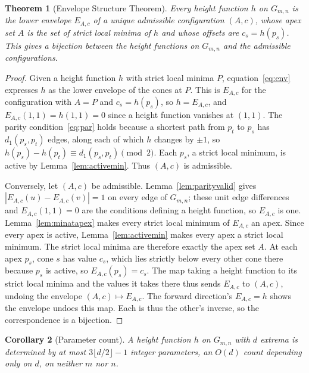 \documentclass[11pt]{article}
\newtheorem{theorem}{Theorem}[section]
\newtheorem{corollary}[theorem]{Corollary}
\theoremstyle{definition}
\theoremstyle{remark}
\newcommand{\dgrid}{d_1}
\newcommand{\Gmn}{G_{m,n}}
\begin{document}
\begin{theorem}[Envelope Structure Theorem]\label{thm:envelope}
Every height function $h$ on $\Gmn$ is the lower envelope $E_{A,c}$ of a
unique admissible configuration $(A,c)$, whose apex set $A$ is the set of
strict local minima of $h$ and whose offsets are $c_s=h(p_s)$. This gives a bijection
between the height functions on $\Gmn$ and the admissible configurations.
\end{theorem}

\begin{proof}
Given a height function $h$ with strict local minima $P$,
equation~\eqref{eq:env} expresses $h$ as the lower envelope of the cones at
$P$. This is $E_{A,c}$ for the configuration with $A=P$ and
$c_s=h(p_s)$, so
$h=E_{A,c}$, and $E_{A,c}(1,1)=h(1,1)=0$ since a height function vanishes
at $(1,1)$. The parity
condition~\eqref{eq:par} holds because a shortest path from $p_t$ to $p_s$ has
$\dgrid(p_s,p_t)$ edges, along each of which $h$ changes by $\pm1$, so
$h(p_s)-h(p_t)\equiv\dgrid(p_s,p_t)\pmod 2$. Each $p_s$, a strict
local minimum, is active by Lemma~\ref{lem:activemin}. Thus $(A,c)$ is
admissible.

\medskip\noindent
Conversely, let $(A,c)$ be admissible. Lemma~\ref{lem:parityvalid} gives
$|E_{A,c}(u)-E_{A,c}(v)|=1$ on every edge of $\Gmn$; these unit edge
differences and $E_{A,c}(1,1)=0$ are the conditions defining a height
function, so $E_{A,c}$ is one.
Lemma~\ref{lem:minatapex} makes every strict local minimum of $E_{A,c}$
an apex. Since every apex is active, Lemma~\ref{lem:activemin}
makes every apex a strict local minimum. The strict local minima are
therefore exactly the apex set $A$. At each apex $p_s$, cone $s$ has value
$c_s$, which lies strictly below every other cone there because $p_s$ is
active, so $E_{A,c}(p_s)=c_s$. The map taking a height function to its strict local
minima and the values it takes there thus sends $E_{A,c}$ to $(A,c)$,
undoing the envelope $(A,c)\mapsto E_{A,c}$. The forward direction's
$E_{A,c}=h$ shows the envelope undoes this map. Each is thus the other's
inverse, so the correspondence is a bijection.
\end{proof}

\begin{corollary}[Parameter count]\label{cor:Odparams}
A height function $h$ on $\Gmn$ with $d$ extrema is determined by at most
$3\lfloor d/2\rfloor-1$ integer parameters, an $O(d)$ count depending only
on $d$, on neither $m$ nor $n$.
\end{corollary}
\end{document}
